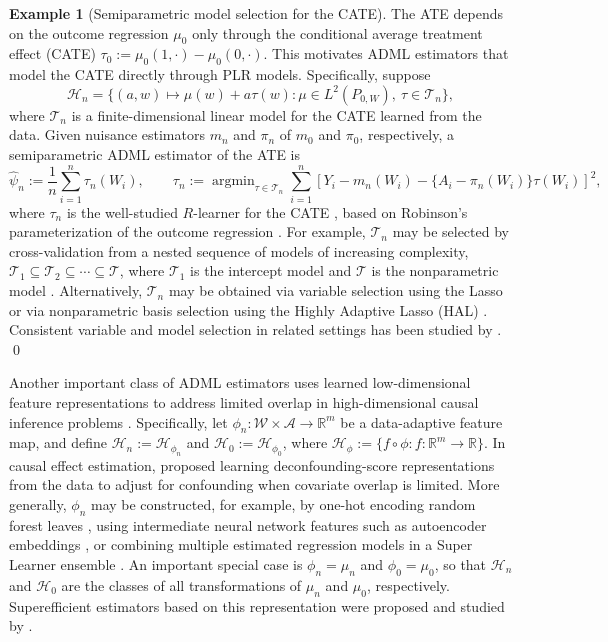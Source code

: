 \documentclass[11pt]{article}
\DeclareMathOperator*{\argmin}{argmin}
\theoremstyle{definition}
\newtheorem{example}{Example}
\begin{document}
\begin{example}[Semiparametric model selection for the CATE]
\label{example::CATE}
The ATE depends on the outcome regression \(\mu_0\) only through the conditional average treatment effect (CATE) \(\tau_0 := \mu_0(1,\cdot)-\mu_0(0,\cdot)\). This motivates ADML estimators that model the CATE directly through PLR models. Specifically, suppose
\[
\mathcal{H}_n
=
\{(a,w) \mapsto \mu(w)+a\tau(w) : \mu \in L^2(P_{0,W}), \ \tau \in \mathcal{T}_n\},
\]
where \(\mathcal{T}_n\) is a finite-dimensional linear model for the CATE learned from the data. Given nuisance estimators \(m_n\) and \(\pi_n\) of \(m_0\) and \(\pi_0\), respectively, a semiparametric ADML estimator of the ATE is
\[
\widehat{\psi}_n := \frac{1}{n}\sum_{i=1}^n \tau_n(W_i),
\qquad
\tau_n
:=
\argmin_{\tau \in \mathcal{T}_n}
\sum_{i=1}^n
\left[
Y_i - m_n(W_i) - \{A_i-\pi_n(W_i)\}\tau(W_i)
\right]^2,
\]
where \(\tau_n\) is the well-studied \(R\)-learner for the CATE \citep{nie2021quasi}, based on Robinson's parameterization of the outcome regression \citep{robinson1988root}. For example, \(\mathcal{T}_n\) may be selected by cross-validation from a nested sequence of models of increasing complexity, \(\mathcal{T}_1 \subseteq \mathcal{T}_2 \subseteq \cdots \subseteq \mathcal{T}\), where \(\mathcal{T}_1\) is the intercept model and \(\mathcal{T}\) is the nonparametric model \citep{shen1997methods, spnpsieve, CTMLE}. Alternatively, \(\mathcal{T}_n\) may be obtained via variable selection using the Lasso \citep{Tibshirani94regressionshrinkage, AdaptLassoOracle, moosavi2023costs} or via nonparametric basis selection using the Highly Adaptive Lasso (HAL) \citep{vanderlaanGenerlaTMLEFIRST, HAL2016, HALoutcomeAdapt}. Consistent variable and model selection in related settings has been studied by \cite{bunea2004consistent, su2014variable, li2008variable, claeskens2007asymptotic, zhao2017selective}. \qed
\end{example}


Another important class of ADML estimators uses learned low-dimensional feature representations to address limited overlap in high-dimensional causal inference problems \citep{d2021overlap}. Specifically, let \(\phi_n:\mathcal{W}\times\mathcal{A}\to\mathbb{R}^m\) be a data-adaptive feature map, and define \(\mathcal{H}_n:=\mathcal{H}_{\phi_n}\) and \(\mathcal{H}_0:=\mathcal{H}_{\phi_0}\), where \(\mathcal{H}_{\phi}:=\{f\circ\phi:f:\mathbb{R}^m\to\mathbb{R}\}\). In causal effect estimation, \citet{d2021deconfounding,clivio2026deconfounding} proposed learning deconfounding-score representations from the data to adjust for confounding when covariate overlap is limited. More generally, \(\phi_n\) may be constructed, for example, by one-hot encoding random forest leaves \citep[Section~3.1]{he2014practical}, using intermediate neural network features such as autoencoder embeddings \citep{ng2011sparse}, or combining multiple estimated regression models in a Super Learner ensemble \citep{wang2023super}. An important special case is \(\phi_n=\mu_n\) and \(\phi_0=\mu_0\), so that \(\mathcal{H}_n\) and \(\mathcal{H}_0\) are the classes of all transformations of \(\mu_n\) and \(\mu_0\), respectively. Superefficient estimators based on this representation were proposed and studied by \citet{ATEsupereff}.
\end{document}
